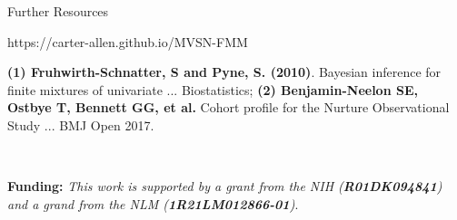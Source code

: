 \documentclass[final]{beamer}
\newlength{\onecolwid}
\begin{document}
\begin{frame}[t]
\begin{columns}[t]
\begin{column}{\onecolwid}
\begin{alertblock}{Further Resources}

\centering
https://carter-allen.github.io/MVSN-FMM

\end{alertblock}

\tiny  \textbf{(1) Fruhwirth-Schnatter, S and Pyne, S. (2010)}. Bayesian inference for finite mixtures of univariate ... Biostatistics; \textbf{(2) Benjamin-Neelon SE, Ostbye T, Bennett GG, et al.} Cohort profile for the Nurture Observational Study ... BMJ Open 2017.

\

\tiny \textbf{Funding:} \textit{This work is supported by a grant from the NIH (\textbf{R01DK094841}) and a grand from the NLM (\textbf{1R21LM012866-01})}.





\end{column} %

\end{columns} %

\end{frame} %
\end{document}

